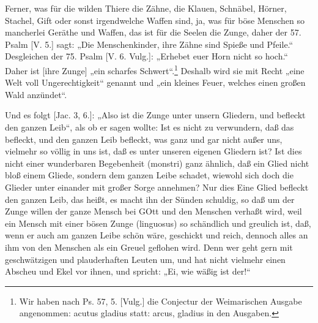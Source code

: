 Ferner, was für die wilden Thiere die Zähne, die Klauen, Schnäbel, Hörner, Stachel, Gift oder sonst irgendwelche Waffen sind, ja, was für böse Menschen so mancherlei Geräthe und Waffen, das ist für die Seelen die Zunge, daher der 57. Psalm [V. 5.] sagt: „Die Menschenkinder, ihre Zähne sind Spieße und Pfeile.“ Desgleichen der 75. Psalm [V. 6. Vulg.]: „Erhebet euer Horn nicht so hoch.“ Daher ist [ihre Zunge] „ein scharfes Schwert“.\footnote{Wir haben nach Ps. 57, 5. [Vulg.] die Conjectur der Weimarischen Ausgabe angenommen: acutus gladius statt: arcus, gladius in den Ausgaben.}
Deshalb wird sie mit Recht „eine Welt voll Ungerechtigkeit“ genannt und „ein kleines Feuer, welches einen großen Wald anzündet“.

Und es folgt [Jac. 3, 6.]: „Also ist die Zunge unter unsern Gliedern, und befleckt den ganzen Leib“, als ob er sagen wollte: Ist es nicht zu verwundern, daß das befleckt, und den ganzen Leib befleckt, was ganz und gar nicht außer uns, vielmehr so völlig in uns ist, daß es unter unseren eigenen Gliedern ist? Ist dies nicht einer wunderbaren Begebenheit (monstri) ganz ähnlich, daß ein Glied nicht bloß einem Gliede, sondern dem ganzen Leibe schadet, wiewohl sich doch die Glieder unter einander mit großer Sorge annehmen? Nur dies Eine Glied befleckt den ganzen Leib, das heißt, es macht ihn der Sünden schuldig, so daß um der Zunge willen der ganze Mensch bei GOtt und den Menschen verhaßt wird, weil ein Mensch mit einer bösen Zunge (linguosus) so schändlich und greulich ist, daß, wenn er auch am ganzen Leibe schön wäre, geschickt und reich, dennoch alles an ihm von den Menschen als ein Greuel geflohen wird. Denn wer geht gern mit geschwätzigen und plauderhaften Leuten um, und hat nicht vielmehr einen Abscheu und Ekel vor ihnen, und spricht: „Ei, wie wäßig ist der!“

